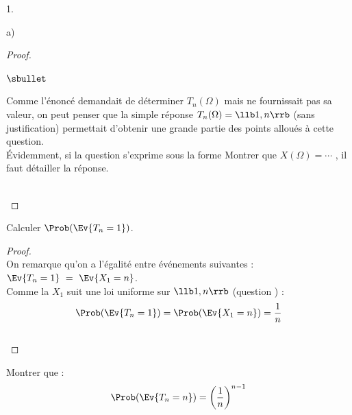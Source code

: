\documentclass[11pt]{article}%
\begin{document}
\begin{noliste}{1.}
\begin{noliste}{a)}
\begin{proof}
\begin{remark}
\begin{noliste}{$\sbullet$}
        \item Comme l'énoncé demandait de déterminer $T_n(\Omega)$
          mais ne fournissait pas sa valeur, on peut penser que la
          simple réponse \og $T_n(\Omega)=\llb 1,n\rrb$ \fg{} (sans
          justification) permettait d'obtenir une grande partie des
          points alloués à cette question.\\
          Évidemment, si la question s'exprime sous la forme \og
          Montrer que $X(\Omega) = \cdots$ \fg{}, il faut détailler la
          réponse.
	\end{noliste}
      \end{remark}~\\[-1.4cm]
    \end{proof}
    
  \item Calculer $\Prob(\Ev{T_n=1})$.
    
    \begin{proof}~\\
      On remarque qu'on a l'égalité entre événements suivantes :
      $
      \Ev{T_n=1} \ = \ \Ev{X_1=n}
      $.\\
      Comme la \var $X_1$ suit une loi uniforme 
      sur $\llb 1,n\rrb$ (question ) :
      \[
      \Prob(\Ev{T_n=1})=\Prob(\Ev{X_1=n})=\dfrac{1}{n}
      \]
      ~\\[-1cm]
    \end{proof}
    
  \item Montrer que :
    \[
    \Prob(\Ev{T_n=n}) = \left(\frac{1}{n}\right)^{n-1}
    \]
    

\end{noliste}
\end{noliste}
\end{document}
